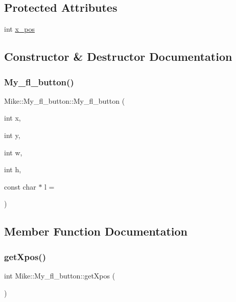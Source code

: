 \subsection*{Protected Attributes}
\begin{DoxyCompactItemize}
\item 
int \hyperlink{class_mike_1_1_my__fl__button_aabe7efb74bd537b378072d3f1e921a72}{x\+\_\+pos}
\end{DoxyCompactItemize}


\subsection{Constructor \& Destructor Documentation}
\mbox{\label{class_mike_1_1_my__fl__button_a3339012650ecdf33d2cb219ec88e7c45}} 
\subsubsection{\texorpdfstring{My\+\_\+fl\+\_\+button()}{My\_fl\_button()}}
{\footnotesize\ttfamily Mike\+::\+My\+\_\+fl\+\_\+button\+::\+My\+\_\+fl\+\_\+button (\begin{DoxyParamCaption}\item[{int}]{x,  }\item[{int}]{y,  }\item[{int}]{w,  }\item[{int}]{h,  }\item[{const char $\ast$}]{l = {} }\end{DoxyParamCaption})}



\subsection{Member Function Documentation}
\mbox{\label{class_mike_1_1_my__fl__button_a046314695eb006cecb6f54dc0f1057e9}} 
\subsubsection{\texorpdfstring{get\+Xpos()}{getXpos()}}
{\footnotesize\ttfamily int Mike\+::\+My\+\_\+fl\+\_\+button\+::get\+Xpos (\begin{DoxyParamCaption}{ }\end{DoxyParamCaption})\hspace{0.3cm}{\ttfamily [inline]}}

